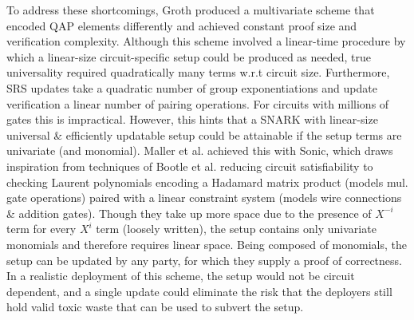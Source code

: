 \noindent To address these shortcomings, Groth \cite{grothupdatable} produced a multivariate scheme that encoded QAP elements differently and achieved constant proof size and verification complexity. Although this scheme involved a linear-time procedure by which a linear-size circuit-specific setup could be produced as needed, true universality required quadratically many terms w.r.t circuit size. Furthermore, SRS updates take a quadratic number of group exponentiations and update verification a linear number of pairing operations. For circuits with millions of gates this is impractical. However, this hints that a SNARK with linear-size universal \& efficiently updatable setup could be attainable if the setup terms are univariate (and monomial). Maller et al. achieved this with Sonic, which draws inspiration from techniques of Bootle et al. \cite{bootlezkargs} reducing circuit satisfiability to checking Laurent polynomials encoding a Hadamard matrix product (models mul. gate operations) paired with a linear constraint system (models wire connections \& addition gates). Though they take up more space due to the presence of $X^{-i}$ term for every $X^i$ term (loosely written), the setup contains only univariate monomials and therefore requires linear space. Being composed of monomials, the setup can be updated by any party, for which they supply a proof of correctness. In a realistic deployment of this scheme, the setup would not be circuit dependent, and a single update could eliminate the risk that the deployers still hold valid toxic waste that can be used to subvert the setup.\\ 

